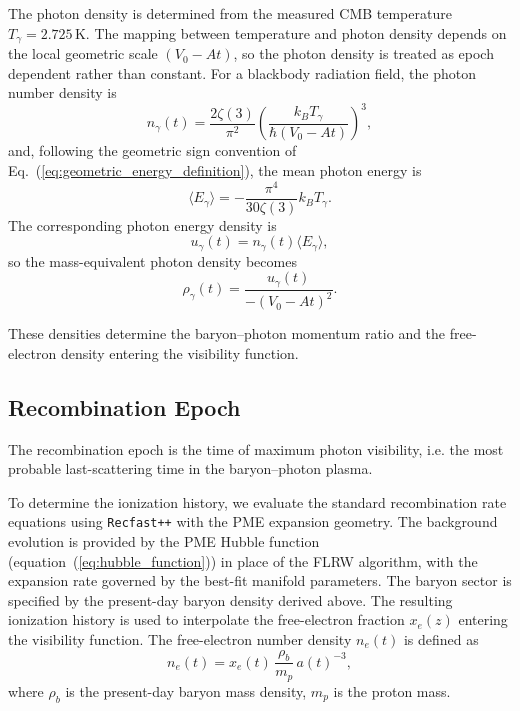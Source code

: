\documentclass[fontsize=12pt, paper=a4]{scrartcl}
\begin{document}
The photon density is determined from the measured CMB temperature $T_\gamma=2.725\,\mathrm{K}$. The mapping between temperature and photon density depends on the local geometric scale $(V_0 - At)$, so the photon density is treated as epoch dependent rather than constant. For a blackbody radiation field, the photon number density is
\begin{equation}
n_\gamma(t)=\frac{2\zeta(3)}{\pi^2}\left(\frac{k_B T_\gamma}{\hbar (V_0-At)}\right)^3 ,
\end{equation}
and, following the geometric sign convention of Eq.~(\ref{eq:geometric_energy_definition}), the mean photon energy is
\begin{equation}
\langle E_\gamma\rangle=-\frac{\pi^4}{30\zeta(3)}k_B T_\gamma .
\end{equation}
The corresponding photon energy density is
\begin{equation}
u_\gamma(t)=n_\gamma(t)\langle E_\gamma\rangle ,
\end{equation}
so the mass-equivalent photon density becomes
\begin{equation}
\rho_\gamma(t)=\frac{u_\gamma(t)}{-(V_0-At)^2}.
\end{equation}

These densities determine the baryon--photon momentum ratio and the free-electron density entering the visibility function.

\subsection{Recombination Epoch}

The recombination epoch is the time of maximum photon visibility, i.e. the most probable last-scattering time in the baryon--photon plasma.

To determine the ionization history, we evaluate the standard recombination rate equations using \texttt{Recfast++} with the PME expansion geometry. The background evolution is provided by the PME Hubble function (equation~(\ref{eq:hubble_function})) in place of the FLRW algorithm, with the expansion rate governed by the best-fit manifold parameters. The baryon sector is specified by the present-day baryon density derived above. The resulting ionization history is used to interpolate the free-electron fraction $x_e(z)$ entering the visibility function. The free-electron number density $n_e(t)$ is defined as
\begin{equation}
n_e(t)=x_e(t)\,\frac{\rho_b}{m_p}\,a(t)^{-3},
\end{equation}
where $\rho_b$ is the present-day baryon mass density, $m_p$ is the proton mass.
\end{document}

